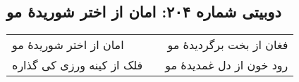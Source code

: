 \begin{center}
\section*{دوبیتی شماره ۲۰۴: امان از اختر شوریدهٔ مو}
\label{sec:204}
\begin{longtable}{l p{0.5cm} r}
امان از اختر شوریدهٔ مو
&&
فغان از بخت برگردیدهٔ مو
\\
فلک از کینه ورزی کی گذاره
&&
رود خون از دل غمدیدهٔ مو
\\
\end{longtable}
\end{center}
